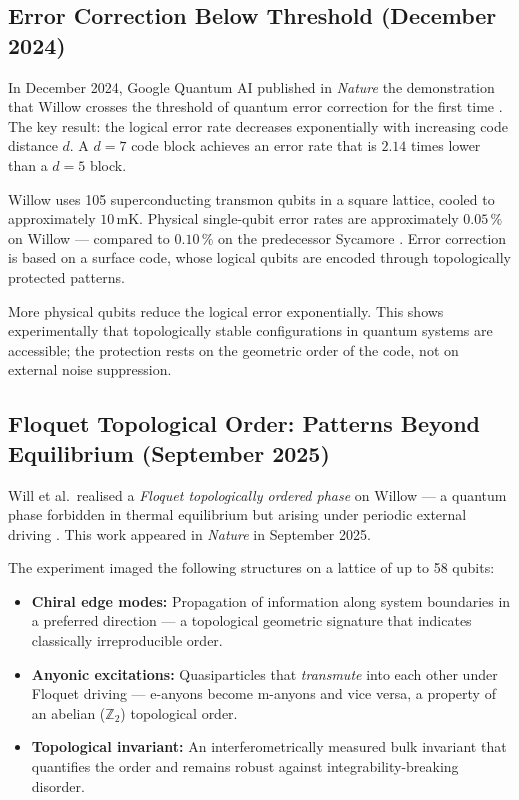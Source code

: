 \subsection{Error Correction Below Threshold (December 2024)}

In December 2024, Google Quantum AI published in \textit{Nature} the demonstration
that Willow crosses the threshold of quantum error correction for the first time
\cite{GoogleWillow2024}. The key result: the logical error rate decreases
exponentially with increasing code distance $d$. A $d=7$ code block achieves an
error rate that is $2.14$ times lower than a $d=5$ block.

Willow uses 105 superconducting transmon qubits in a square lattice, cooled to
approximately $10\,\text{mK}$. Physical single-qubit error rates are approximately
$0.05\,\%$ on Willow — compared to $0.10\,\%$ on the predecessor Sycamore
\cite{Will2025PubMed}. Error correction is based on a surface code, whose logical
qubits are encoded through topologically protected patterns.

\begin{keypoint}
More physical qubits reduce the logical error exponentially. This shows experimentally
that topologically stable configurations in quantum systems are accessible; the
protection rests on the geometric order of the code, not on external noise suppression.
\end{keypoint}

\subsection{Floquet Topological Order: Patterns Beyond Equilibrium
(September 2025)}

Will et al.\ realised a \emph{Floquet topologically ordered phase} on Willow — a
quantum phase forbidden in thermal equilibrium but arising under periodic external
driving \cite{Will2025Nature}. This work appeared in \textit{Nature} in September 2025.

\begin{keyresult}
The experiment imaged the following structures on a lattice of up to 58 qubits:
\begin{itemize}
    \item \textbf{Chiral edge modes:} Propagation of information along system
    boundaries in a preferred direction — a topological geometric signature that
    indicates classically irreproducible order.
    \item \textbf{Anyonic excitations:} Quasiparticles that \emph{transmute} into
    each other under Floquet driving — e-anyons become m-anyons and vice versa,
    a property of an abelian ($\mathbb{Z}_2$) topological order.
    \item \textbf{Topological invariant:} An interferometrically measured bulk
    invariant that quantifies the order and remains robust against
    integrability-breaking disorder.
\end{itemize}
\end{keyresult}

